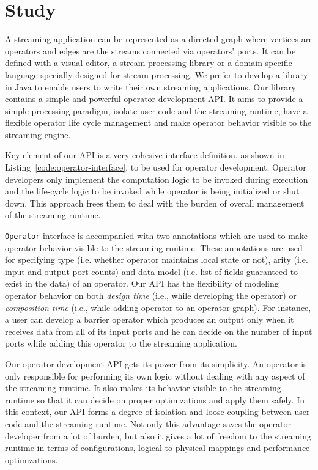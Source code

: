 \section{Study}\label{sec:study}

A streaming application can be represented as a directed graph where vertices are operators and edges are the streams connected via operators' ports. It can be defined with a visual editor, a stream processing library or a domain specific language specially designed for stream processing. We prefer to develop a library in Java to enable users to write their own streaming applications. Our library contains a simple and powerful operator development API. It aims to provide a simple processing paradigm, isolate user code and the streaming runtime, have a flexible operator life cycle management and make operator behavior visible to the streaming engine. 

Key element of our API is a very cohesive interface definition, as shown in Listing~\ref{code:operator-interface}, to be used for operator development. Operator developers only implement the computation logic to be invoked during execution and the life-cycle logic to be invoked while operator is being initialized or shut down. This approach frees them to deal with the burden of overall management of the streaming runtime.

\texttt{Operator} interface is accompanied with two annotations which are used to make operator behavior visible to the streaming runtime. These annotations are used for specifying type (i.e. whether operator maintains local state or not), arity (i.e. input and output port counts) and data model (i.e. list of fields guaranteed to exist in the data) of an operator. Our API has the flexibility of modeling operator behavior on both \textit{design time} (i.e., while developing the operator) or \textit{composition time} (i.e., while adding operator to an operator graph). For instance, a user can develop a barrier operator which produces an output only when it receives data from all of its input ports and he can decide on the number of input ports while adding this operator to the streaming application. 

Our operator development API gets its power from its simplicity. An operator is only responsible for performing its own logic without dealing with any aspect of the streaming runtime. It also makes its behavior visible to the streaming runtime so that it can decide on proper optimizations and apply them safely. In this context, our API forms a degree of isolation and loose coupling between user code and the streaming runtime. Not only this advantage saves the operator developer from a lot of burden, but also it gives a lot of freedom to the streaming runtime in terms of configurations, logical-to-physical mappings and performance optimizations.

